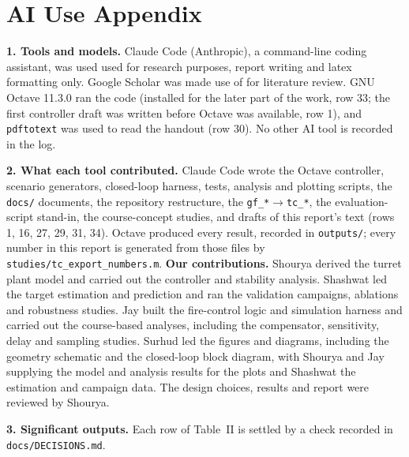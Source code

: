 \documentclass[conference]{IEEEtran}
\begin{document}
\section{AI Use Appendix}
\textbf{1. Tools and models.} Claude Code (Anthropic), a command-line coding assistant, was used used for research purposes, report writing and latex formatting only. Google Scholar was made use of for literature review.
GNU Octave 11.3.0 ran the code (installed for the later part of the work, row 33; the first controller draft was written before Octave was available, row 1), and \texttt{pdftotext} was used to read the handout (row 30). No other AI tool is recorded in the log.

\textbf{2. What each tool contributed.} Claude Code wrote the Octave controller, scenario generators, closed-loop harness, tests, analysis and plotting scripts, the \texttt{docs/} documents, the repository restructure, the \texttt{gf\_*}$\rightarrow$\texttt{tc\_*}, the evaluation-script stand-in, the course-concept studies, and drafts of this report's text (rows 1, 16, 27, 29, 31, 34). Octave produced every result, recorded in \texttt{outputs/}; every number in this report is generated from those files by \texttt{studies/tc\_export\_numbers.m}.
\textbf{Our contributions.} Shourya derived the turret plant model and carried out the controller and stability analysis. Shashwat led the target estimation and prediction and ran the validation campaigns, ablations and robustness studies. Jay built the fire-control logic and simulation harness and carried out the course-based analyses, including the compensator, sensitivity, delay and sampling studies. Surhud led the figures and diagrams, including the geometry schematic and the closed-loop block diagram, with Shourya and Jay supplying the model and analysis results for the plots and Shashwat the estimation and campaign data. The design choices, results and report were reviewed by Shourya.

\textbf{3. Significant outputs.} Each row of Table~II is settled by a check recorded in \texttt{docs/DECISIONS.md}.
\end{document}
